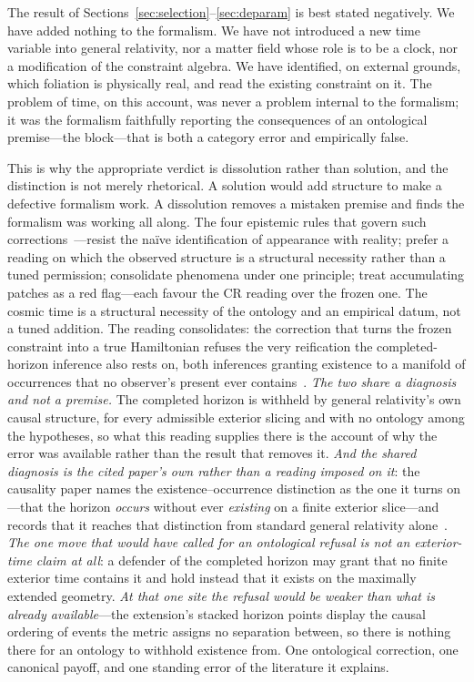 \documentclass[11pt,a4paper]{article}
\theoremstyle{plain}
\theoremstyle{definition}
\theoremstyle{remark}
\begin{document}
The result of Sections~\ref{sec:selection}--\ref{sec:deparam} is best stated negatively. We have added nothing to the formalism. We have not introduced a new time variable into general relativity, nor a matter field whose role is to be a clock, nor a modification of the constraint algebra. We have identified, on external grounds, which foliation is physically real, and read the existing constraint on it. The problem of time, on this account, was never a problem internal to the formalism; it was the formalism faithfully reporting the consequences of an ontological premise---the block---that is both a category error and empirically false.

This is why the appropriate verdict is dissolution rather than solution, and the distinction is not merely rhetorical. A solution would add structure to make a defective formalism work. A dissolution removes a mistaken premise and finds the formalism was working all along. The four epistemic rules that govern such corrections~\cite{JanzenFortress, JanzenShadowExistence}---resist the naïve identification of appearance with reality; prefer a reading on which the observed structure is a structural necessity rather than a tuned permission; consolidate phenomena under one principle; treat accumulating patches as a red flag---each favour the CR reading over the frozen one. The cosmic time is a structural necessity of the ontology and an empirical datum, not a tuned addition. The reading consolidates: the correction that turns the frozen constraint into a true Hamiltonian refuses the very reification the completed-horizon inference also rests on, both inferences granting existence to a manifold of occurrences that no observer's present ever contains~\cite{JanzenBHcausality, JanzenFortress}. \emph{The two share a diagnosis and not a premise.} The completed horizon is withheld by general relativity's own causal structure, for every admissible exterior slicing and with no ontology among the hypotheses, so what this reading supplies there is the account of why the error was available rather than the result that removes it. \emph{And the shared diagnosis is the cited paper's own rather than a reading imposed on it}: the causality paper names the existence--occurrence distinction as the one it turns on---that the horizon \emph{occurs} without ever \emph{existing} on a finite exterior slice---and records that it reaches that distinction from standard general relativity alone~\cite{JanzenBHcausality}. \emph{The one move that would have called for an ontological refusal is not an exterior-time claim at all}: a defender of the completed horizon may grant that no finite exterior time contains it and hold instead that it exists on the maximally extended geometry. \emph{At that one site the refusal would be weaker than what is already available}---the extension's stacked horizon points display the causal ordering of events the metric assigns no separation between, so there is nothing there for an ontology to withhold existence from. One ontological correction, one canonical payoff, and one standing error of the literature it explains.
\end{document}
